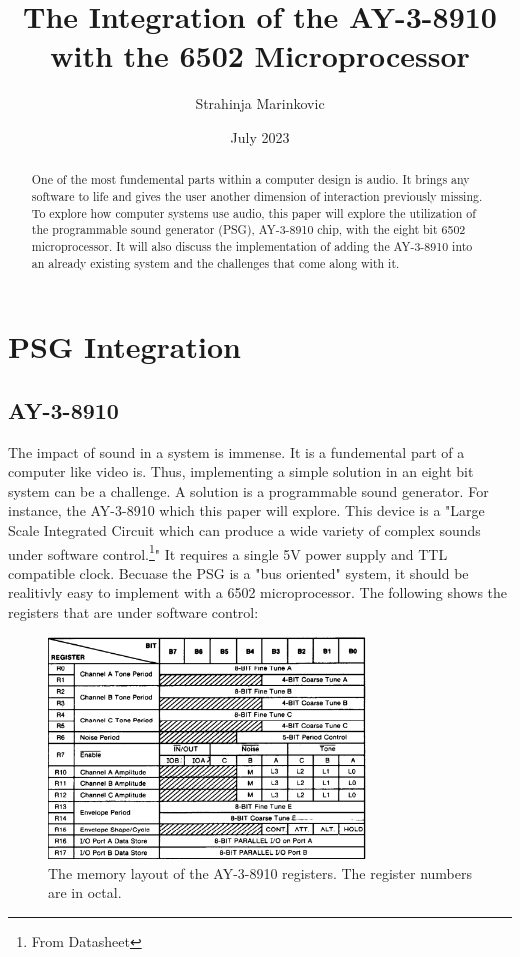 \documentclass[12pt, letterpaper]{article}
\title{The Integration of the AY-3-8910 with the 6502 Microprocessor}
\author{Strahinja Marinkovic}
\date{July 2023}
\begin{document}
\maketitle

\begin{abstract}
One of the most fundemental parts within a computer design is audio. It brings any software to life
and gives the user another dimension of interaction previously missing. To explore how computer systems
use audio, this paper will explore the utilization of the programmable sound generator (PSG), AY-3-8910 chip, with the eight bit 6502 microprocessor. It will also discuss the implementation of adding the AY-3-8910 into an already existing system and the challenges that come along with it. 
\end{abstract}

\newpage

\section{PSG Integration}
\subsection{AY-3-8910}
The impact of sound in a system is immense. It is a fundemental part of a computer like video is. Thus, implementing
a simple solution in an eight bit system can be a challenge. A solution is a programmable sound generator. For instance,
the AY-3-8910 which this paper will explore. This device is a "Large Scale Integrated Circuit which can produce a wide variety of complex sounds under software control.\footnote{From Datasheet}" It requires a single 5V power supply and TTL compatible clock. Becuase the PSG is a "bus oriented" system, it should be realitivly easy to implement with a 6502 microprocessor. The following shows the registers that are under software control:

\begin{figure}[h]
    \includegraphics[width=0.75\textwidth, center]{psg_register_array}
    \caption{The memory layout of the AY-3-8910 registers. The register numbers are in octal.}
    \label{fig:registers_figure}
\end{figure}
\end{document}
